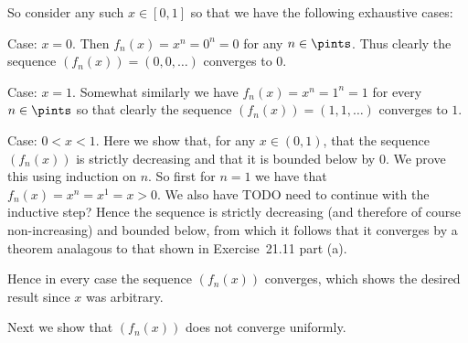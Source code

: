 {{    So consider any such $x \in [0,1]$ so that we have the following exhaustive cases:

    Case: $x = 0$.
    Then $f_n(x) = x^n = 0^n = 0$ for any $n \in \pints$.
    Thus clearly the sequence $(f_n(x)) = (0,0,\ldots)$ converges to $0$.

    Case: $x = 1$.
    Somewhat similarly we have $f_n(x) = x^n = 1^n = 1$ for every $n \in \pints$ so that clearly the sequence $(f_n(x)) = (1,1,\ldots)$ converges to $1$.

    Case: $0 < x < 1$.
    Here we show that, for any $x \in (0,1)$, that the sequence $(f_n(x))$ is strictly decreasing and that it is bounded below by $0$.
    We prove this using induction on $n$.
    So first for $n = 1$ we have that $f_n(x) = x^n = x^1 = x > 0$.
    We also have
    TODO need to continue with the inductive step?
    Hence the sequence is strictly decreasing (and therefore of course non-increasing) and bounded below, from which it follows that it converges by a theorem analagous to that shown in Exercise~21.11 part (a).

    Hence in every case the sequence $(f_n(x))$ converges, which shows the desired result since $x$ was arbitrary.

    Next we show that $(f_n(x))$ does not converge uniformly.
  }
}
